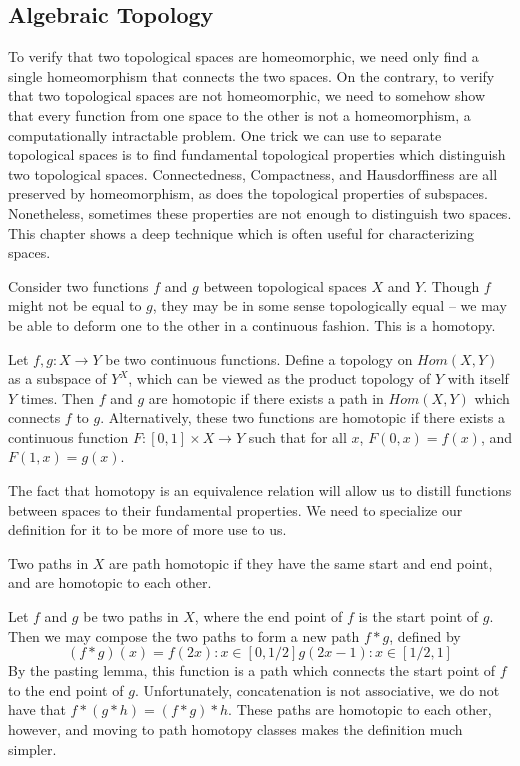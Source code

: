 \begin{example}
\chapter{Algebraic Topology}

To verify that two topological spaces are homeomorphic, we need only find a single homeomorphism that connects the two spaces. On the contrary, to verify that two topological spaces are not homeomorphic, we need to somehow show that every function from one space to the other is not a homeomorphism, a computationally intractable problem. One trick we can use to separate topological spaces is to find fundamental topological properties which distinguish two topological spaces. Connectedness, Compactness, and Hausdorffiness are all preserved by homeomorphism, as does the topological properties of subspaces. Nonetheless, sometimes these properties are not enough to distinguish two spaces. This chapter shows a deep technique which is often useful for characterizing spaces.

Consider two functions $f$ and $g$ between topological spaces $X$ and $Y$. Though $f$ might not be equal to $g$, they may be in some sense topologically equal -- we may be able to deform one to the other in a continuous fashion. This is a homotopy.

\begin{definition}
    Let $f,g: X \to Y$ be two continuous functions. Define a topology on $Hom(X,Y)$ as a subspace of $Y^X$, which can be viewed as the product topology of $Y$ with itself $Y$ times. Then $f$ and $g$ are homotopic if there exists a path in $Hom(X,Y)$ which connects $f$ to $g$. Alternatively, these two functions are homotopic if there exists a continuous function $F:[0,1] \times X \to Y$ such that for all $x$, $F(0,x) = f(x)$, and $F(1,x) = g(x)$.
\end{definition}

The fact that homotopy is an equivalence relation will allow us to distill functions between spaces to their fundamental properties. We need to specialize our definition for it to be more of more use to us.

\begin{definition}
    Two paths in $X$ are path homotopic if they have the same start and end point, and are homotopic to each other.
\end{definition}

Let $f$ and $g$ be two paths in $X$, where the end point of $f$ is the start point of $g$. Then we may compose the two paths to form a new path $f * g$, defined by
%
\[ (f * g)(x) = f(2x): x \in [0,1/2]
                g(2x - 1): x \in [1/2,1] \]
%
By the pasting lemma, this function is a path which connects the start point of $f$ to the end point of $g$. Unfortunately, concatenation is not associative, we do not have that $f * (g * h) = (f * g) * h$. These paths are homotopic to each other, however, and moving to path homotopy classes makes the definition much simpler.


\end{example}
